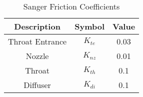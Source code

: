 \begin{table}[h]
\centering
\begin{tabular}{|c|c|c|}
\hline
Description & Symbol & Value \\
\hline
Throat Entrance & $K_{te}$ & 0.03 \\
Nozzle & $K_{nz}$ & 0.01 \\
Throat & $K_{th}$ & 0.1 \\
Diffuser & $K_{di}$ & 0.1 \\
\hline
\end{tabular}
\caption{Sanger Friction Coefficients}
\label{tab:fric_coeff_sanger}
\end{table}